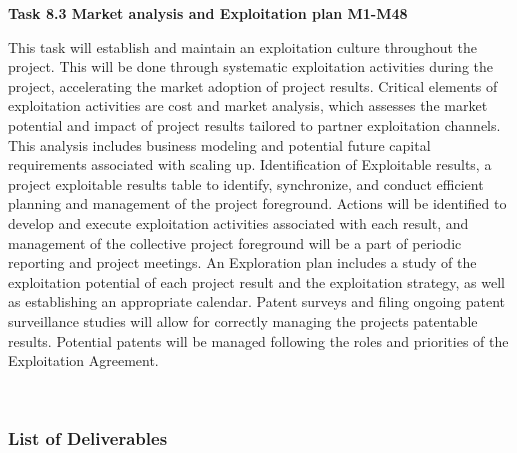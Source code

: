 \begin{longtable}[]
{\textbf{Task 8.3 Market analysis and Exploitation plan M1-M48}

This task will establish and maintain an exploitation culture throughout
the project. This will be done through systematic exploitation
activities during the project, accelerating the market adoption of
project results. Critical elements of exploitation activities are cost
and market analysis, which assesses the market potential and impact of
project results tailored to partner exploitation channels. This analysis
includes business modeling and potential future capital requirements
associated with scaling up. Identification of Exploitable results, a
project exploitable results table to identify, synchronize, and conduct
efficient planning and management of the project foreground. Actions
will be identified to develop and execute exploitation activities
associated with each result, and management of the collective project
foreground will be a part of periodic reporting and project meetings. An
Exploration plan includes a study of the exploitation potential of each
project result and the exploitation strategy, as well as establishing an
appropriate calendar. Patent surveys and filing ongoing patent
surveillance studies will allow for correctly managing the
project\textquotesingle s patentable results. Potential patents will be
managed following the roles and priorities of the Exploitation
Agreement.} \\
\end{longtable}

\subsubsection{\texorpdfstring{List of Deliverables
}{List of Deliverables }}\label{list-of-deliverables}

